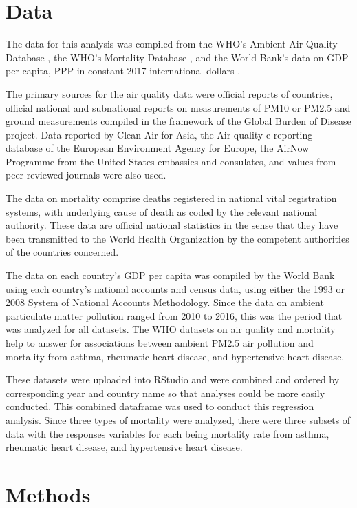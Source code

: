 \documentclass[12pt, letterpaper, twoside]{article}\usepackage[]{graphicx}\usepackage[]{xcolor}
\begin{document}
\section*{Data}
The data for this analysis was compiled from the WHO's Ambient Air Quality
Database \citep{who2022airquality}, the WHO's Mortality Database
\citep{who2022all}, and the World Bank's data on GDP per capita, PPP
in constant 2017 international dollars \citep{worldbank2022}.\par
The primary sources
for the air quality data were official reports of countries, official national
and subnational reports on measurements of PM10 or PM2.5 and ground measurements
compiled in the framework of the Global Burden of Disease project. Data reported
by Clean Air for Asia, the Air quality e-reporting database of the European
Environment Agency for Europe, the AirNow Programme from the United States
embassies and consulates, and values from peer-reviewed journals were also used.\par
The data on mortality comprise deaths registered in national vital registration
systems, with underlying cause of death as coded by the relevant national
authority. These data are official national statistics in the sense that they
have been transmitted to the World Health Organization by the competent
authorities of the countries concerned.\par
The data on each country's GDP per
capita was compiled by the World Bank using each country's national accounts and
census data, using either the 1993 or 2008 System of National Accounts
Methodology. Since the data on ambient particulate matter pollution ranged from
2010 to 2016, this was the period that was analyzed for all datasets. The WHO
datasets on air quality and mortality help to answer for associations between
ambient PM2.5 air pollution and mortality from asthma, rheumatic heart disease,
and hypertensive heart disease.\par
These datasets were uploaded into RStudio and
were combined and ordered by corresponding year and country name so that analyses
could be more easily conducted. This combined dataframe was used to conduct this
regression analysis. Since three types of mortality were analyzed, there were
three subsets of data with the responses variables for each being mortality
rate from asthma, rheumatic heart disease, and hypertensive heart disease.


\section*{Methods}
\end{document}
